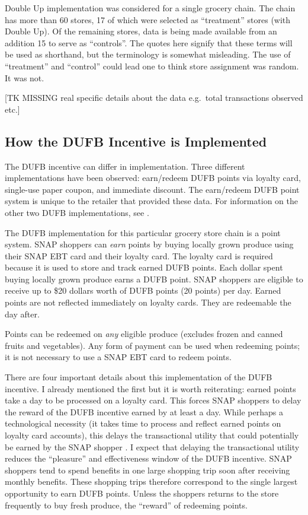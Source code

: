 \documentclass[12pt,letterpaperpaper,]{book}
\begin{document}
Double Up implementation was considered for a single grocery chain. The
chain has more than 60 stores, 17 of which were selected as
``treatment'' stores (with Double Up). Of the remaining stores, data is
being made available from an addition 15 to serve as ``controls''. The
quotes here signify that these terms will be used as shorthand, but the
terminology is somewhat misleading. The use of ``treatment'' and
``control'' could lead one to think store assignment was random. It was
not.

{[}TK MISSING real specific details about the data e.g.~total
transactions observed etc.{]}

\subsection*{How the DUFB Incentive is
Implemented}\label{how-the-dufb-incentive-is-implemented}

The DUFB incentive can differ in implementation. Three different
implementations have been observed: earn/redeem DUFB points via loyalty
card, single-use paper coupon, and immediate discount. The earn/redeem
DUFB point system is unique to the retailer that provided these data.
For information on the other two DUFB implementations, see
\citep{margaret_schnuck_doubling_2016}.

The DUFB implementation for this particular grocery store chain is a
point system. SNAP shoppers can \emph{earn} points by buying locally
grown produce using their SNAP EBT card and their loyalty card. The
loyalty card is required because it is used to store and track earned
DUFB points. Each dollar spent buying locally grown produce earns a DUFB
point. SNAP shoppers are eligible to receive up to \$20 dollars worth of
DUFB points (20 points) per day. Earned points are not reflected
immediately on loyalty cards. They are redeemable the day after.

Points can be redeemed on \emph{any} eligible produce (excludes frozen
and canned fruits and vegetables). Any form of payment can be used when
redeeming points; it is not necessary to use a SNAP EBT card to redeem
points.

There are four important details about this implementation of the DUFB
incentive. I already mentioned the first but it is worth reiterating:
earned points take a day to be processed on a loyalty card. This forces
SNAP shoppers to delay the reward of the DUFB incentive earned by at
least a day. While perhaps a technological necessity (it takes time to
process and reflect earned points on loyalty card accounts), this delays
the transactional utility that could potentially be earned by the SNAP
shopper \citep{thaler_mental_1985}. I expect that delaying the
transactional utility reduces the ``pleasure'' and effectiveness window
of the DUFB incentive. SNAP shoppers tend to spend benefits in one large
shopping trip soon after receiving monthly benefits. These shopping
trips therefore correspond to the single largest opportunity to earn
DUFB points. Unless the shoppers returns to the store frequently to buy
fresh produce, the ``reward'' of redeeming points.
\end{document}
